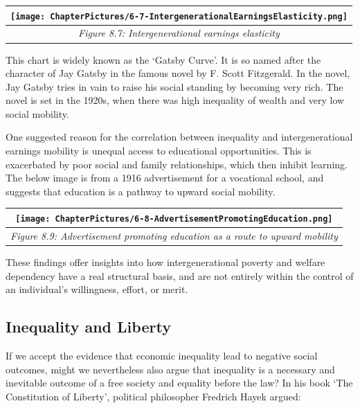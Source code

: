 \documentclass[]{tufte-handout}
\begin{document}
\begin{longtable}[]{@{}c@{}}
\toprule
\texttt{[image: ChapterPictures/6-7-IntergenerationalEarningsElasticity.png]}\tabularnewline
\midrule
\endhead
\emph{Figure 8.7: Intergenerational earnings elasticity}\tabularnewline
\bottomrule
\end{longtable}

This chart is widely known as the `Gatsby Curve'. It is so named after
the character of Jay Gatsby in the famous novel by F. Scott Fitzgerald.
In the novel, Jay Gatsby tries in vain to raise his social standing by
becoming very rich. The novel is set in the 1920s, when there was high
inequality of wealth and very low social mobility.

One suggested reason for the correlation between inequality and
intergenerational earnings mobility is unequal access to educational
opportunities. This is exacerbated by poor social and family
relationships, which then inhibit learning. The below image is from a
1916 advertisement for a vocational school, and suggests that education
is a pathway to upward social mobility.

\begin{longtable}[]{@{}c@{}}
\toprule
\begin{minipage}[b]{0.97\columnwidth}\centering
\texttt{[image: ChapterPictures/6-8-AdvertisementPromotingEducation.png]}\strut
\end{minipage}\tabularnewline
\midrule
\endhead
\begin{minipage}[t]{0.97\columnwidth}\centering
\emph{Figure 8.9: Advertisement promoting education as a route to upward
mobility}\strut
\end{minipage}\tabularnewline
\bottomrule
\end{longtable}

These findings offer insights into how intergenerational poverty and
welfare dependency have a real structural basis, and are not entirely
within the control of an individual's willingness, effort, or merit.

\hypertarget{inequality-and-liberty}{%
\subsection{Inequality and Liberty}\label{inequality-and-liberty}}

If we accept the evidence that economic inequality lead to negative
social outcomes, might we nevertheless also argue that inequality is a
necessary and inevitable outcome of a free society and equality before
the law? In his book `The Constitution of Liberty', political
philosopher Fredrich Hayek argued:
\end{document}
